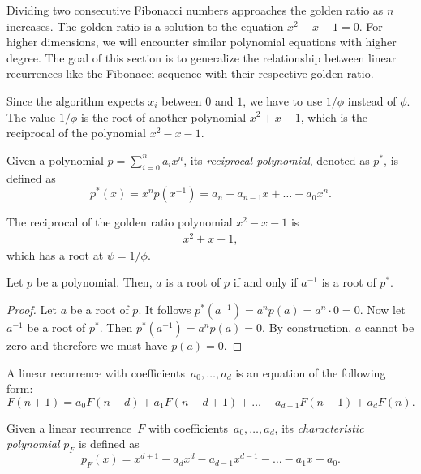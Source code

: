 \documentclass[english,version-2020-11]{uzl-thesis}
\begin{document}
Dividing two consecutive Fibonacci numbers approaches the golden ratio as $n$ increases.
The golden ratio is a solution to the equation $x^2 - x - 1 = 0$.
For higher dimensions, we will encounter similar polynomial equations with higher degree.
The goal of this section is to generalize the relationship between linear
recurrences like the Fibonacci sequence with their respective golden ratio.

Since the algorithm expects $x_i$ between $0$ and $1$, we have to use $1/\phi$ instead of $\phi$.
The value $1/\phi$ is the root of another polynomial $x^2 + x - 1$, which is the reciprocal
of the polynomial $x^2 - x - 1$.

\begin{definition}
  Given a polynomial $p = \sum_{i=0}^n a_i x^n$, its \emph{reciprocal polynomial},
  denoted as $p^*$, is defined as
  \[
    p^*(x) = x^n p(x^{-1}) = a_n + a_{n-1} x + \dots + a_0 x^n.
  \]
\end{definition}

\begin{example}
  The reciprocal of the golden ratio polynomial $x^2 - x - 1$ is
  \begin{align*}
    x^2 + x - 1,
  \end{align*}
  which has a root at $\psi = 1/\phi$.
\end{example}

\begin{lemma}
  Let $p$ be a polynomial. Then, $a$ is a root of $p$ if and only if $a^{-1}$ is a root of $p^*$.
\end{lemma}

\begin{proof}
  Let $a$ be a root of $p$. It follows $p^*(a^{-1}) = a^n p(a) = a^n \cdot 0 = 0$.
  Now let $a^{-1}$ be a root of $p^*$. Then $p^*(a^{-1}) = a^n p(a) = 0$.
  By construction, $a$ cannot be zero and therefore we must have $p(a) = 0$.
\end{proof}

\begin{definition}
  A linear recurrence with coefficients~$a_0, \dots, a_d$ is an equation of the
  following form:
  \[
    F(n + 1) = a_0 F(n - d) + a_1 F(n - d + 1) + \dots + a_{d-1} F(n - 1) + a_d F(n).
  \]
\end{definition}

\begin{definition}
  Given a linear recurrence~$F$ with coefficients~$a_0, \dots, a_d$, its
  \emph{characteristic polynomial} $p_F$ is defined as
  \[
    p_F(x) = x^{d+1} - a_d x^d - a_{d-1} x^{d-1} - \dots - a_1 x - a_0.
  \]
\end{definition}
\end{document}

